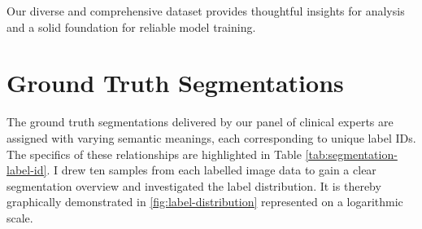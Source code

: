 Our diverse and comprehensive dataset provides thoughtful insights for analysis and a solid foundation for reliable model training.

\section{Ground Truth Segmentations}

The ground truth segmentations delivered by our panel of clinical experts are assigned with varying semantic meanings, each corresponding to unique label IDs. The specifics of these relationships are highlighted in Table \ref{tab:segmentation-label-id}. I drew ten samples from each labelled image data to gain a clear segmentation overview and investigated the label distribution. It is thereby graphically demonstrated in \autoref{fig:label-distribution} represented on a logarithmic scale.

